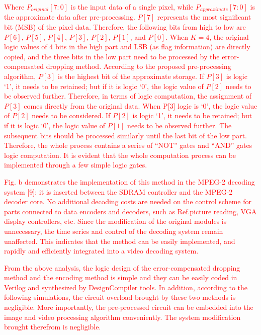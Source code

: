 \documentclass[lettersize,journal]{IEEEtran}
\begin{document}
\textcolor{red}{Where $P_{original}[7 : 0]$ is the input data of a single pixel, while $P_{approximate}[7 : 0]$ is the approximate data after pre-processing. $P[7]$ represents the most significant bit (MSB) of the pixel data. Therefore, the following bits from high to low are $P[6]$, $P[5]$, $P[4]$, $P[3]$, $P[2]$, $P[1]$, and $P[0]$. When $K=4$, the original logic values of 4 bits in the high part and LSB (as flag information) are directly copied, and the three bits in the low part need to be processed by the error-compensated dropping method. According to the proposed pre-processing algorithm, $P[3]$ is the highest bit of the approximate storage. If $P[3]$ is logic `1', it needs to be retained; but if it is logic `0', the logic value of $P[2]$ needs to be observed further. Therefore, in terms of logic computation, the assignment of $P[3]$ comes directly from the original data. When P[3] logic is `0', the logic value of $P[2]$ needs to be considered. If $P[2]$ is logic `1', it needs to be retained; but if it is logic `0', the logic value of $P[1]$ needs to be observed further. The subsequent bits should be processed similarly until the last bit of the low part. Therefore, the whole process contains a series of ``NOT'' gates and ``AND'' gates logic computation. It is evident that the whole computation process can be implemented through a few simple logic gates.} 

\textcolor{red}{Fig. b demonstrates the implementation of this method in the MPEG-2 decoding system [9]: it is inserted between the SDRAM controller and the MPEG-2 decoder core. No additional decoding costs are needed on the control scheme for parts connected to data encoders and decoders, such as Ref.picture reading, VGA display controllers, etc. Since the modification of the original modules is unnecessary, the time series and control of the decoding system remain unaffected. This indicates that the method can be easily implemented, and rapidly and efficiently integrated into a video decoding system.}

\textcolor{red}{From the above analysis, the logic design of the error-compensated dropping method and the encoding method is simple and they can be easily coded in Verilog and synthesized by DesignCompiler tools. In addition, according to the following simulations, the circuit overload brought by these two methods is negligible. More importantly, the pre-processed circuit can be embedded into the image and video processing algorithm conveniently. The system modification brought therefrom is negligible.}
\end{document}
